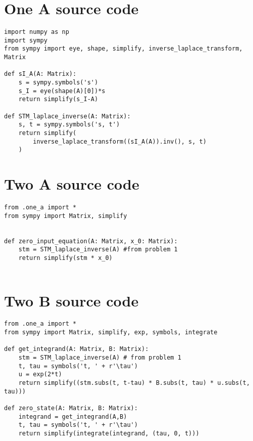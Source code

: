 \appendix

\vspace{2cm}
\section{One A source code} \label{appendix:one-a-src}
\begin{verbatim}
import numpy as np
import sympy
from sympy import eye, shape, simplify, inverse_laplace_transform, Matrix

def sI_A(A: Matrix):
    s = sympy.symbols('s')
    s_I = eye(shape(A)[0])*s
    return simplify(s_I-A)

def STM_laplace_inverse(A: Matrix):
    s, t = sympy.symbols('s, t')
    return simplify(
        inverse_laplace_transform((sI_A(A)).inv(), s, t)
    )
\end{verbatim}

\section{Two A source code} \label{appendix:two-a-src}
\begin{verbatim}
from .one_a import *
from sympy import Matrix, simplify


def zero_input_equation(A: Matrix, x_0: Matrix):
    stm = STM_laplace_inverse(A) #from problem 1 
    return simplify(stm * x_0)


\end{verbatim}

\section{Two B source code} \label{appendix:two-b-src}
\begin{verbatim}
from .one_a import *
from sympy import Matrix, simplify, exp, symbols, integrate

def get_integrand(A: Matrix, B: Matrix):
    stm = STM_laplace_inverse(A) # from problem 1
    t, tau = symbols('t, ' + r'\tau')
    u = exp(2*t)
    return simplify((stm.subs(t, t-tau) * B.subs(t, tau) * u.subs(t, tau)))
    
def zero_state(A: Matrix, B: Matrix):
    integrand = get_integrand(A,B)
    t, tau = symbols('t, ' + r'\tau')
    return simplify(integrate(integrand, (tau, 0, t)))
\end{verbatim}


